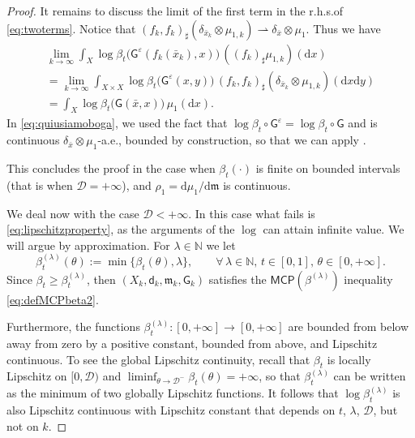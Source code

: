 \documentclass[11pt,a4paper]{article}
\theoremstyle{plain}
\theoremstyle{definition}
\theoremstyle{remark}
\numberwithin{equation}{section}
\newcommand{\N}{\mathbb{N}} %
\newcommand{\ve}{\varepsilon}
\newcommand{\MCP}{\mathsf{MCP}}
\newcommand{\cD}{\mathcal{D}}
\newcommand{\di}{\mathrm{d}}
\newcommand{\mm}{\mathfrak m}
\newcommand{\sfd}{\mathsf d}
\newcommand{\sfG}{\mathsf G}
\begin{document}
\begin{proof}
It remains to discuss the limit of the first term in the r.h.s.\@ of \eqref{eq:twoterms}. Notice that $(f_k,f_k)_\sharp (\delta_{\bar{x}_k}\otimes \mu_{1,k}) \rightharpoonup \delta_{\bar{x}}\otimes \mu_1$. Thus we have
\begin{multline}
\lim_{k\to \infty}   \int_{X} \log\beta_t\big(\sfG^{\ve}(f_k(\bar{x}_k),x)\big)\,((f_k)_\sharp\mu_{1,k})(\di x)  \\ 
 = \lim_{k\to \infty}  \int_{X\times X} \log\beta_t\big(\sfG^{\ve}(x,y)\big)\,(f_k,f_k)_\sharp \left(\delta_{\bar{x}_k}\otimes \mu_{1,k}\right)(\di x \di y) \\
 = \int_{X} \log\beta_t\big(\sfG(\bar{x},x)\big)\,\mu_1(\di x).\label{eq:quiusiamoboga}
\end{multline}
In \eqref{eq:quiusiamoboga}, we used the fact that $\log\beta_t\circ\sfG^\ve = \log\beta_t\circ \sfG$ and is continuous $\delta_{\bar{x}}\otimes\mu_1$-a.e., bounded by construction, so that we can apply \cite[Cor.\ 2.2.10]{Bogachev-Weak}.

This concludes the proof in the case when $\beta_t(\cdot)$ is finite on bounded intervals (that is when $\cD=+\infty$), and $\rho_1=\di \mu_1/\di \mm$ is continuous. 

We deal now with the case $\cD<+\infty$. In this case what fails is \eqref{eq:lipschitzproperty}, as the arguments of the $\log$ can attain infinite value. We will argue by approximation. For $\lambda \in \N$ we let
\begin{equation}
\beta_t^{(\lambda)}(\theta):=\min\{\beta_t(\theta),\lambda\}, \qquad \forall\,\lambda\in \N,\,t\in[0,1],\,\theta \in [0,+\infty].
\end{equation}
Since $\beta_t \geq \beta_t^{(\lambda)}$, then $(X_k,\sfd_k,\mm_k,\sfG_k)$ satisfies the $\MCP(\beta^{(\lambda)})$ inequality \eqref{eq:defMCPbeta2}.

Furthermore, the functions $\beta_t^{(\lambda)}:[0,+\infty]\to [0,+\infty]$ are bounded from below away from zero by a positive constant, bounded from above, and Lipschitz continuous. To see the global Lipschitz continuity, recall that $\beta_t$ is locally Lipschitz on $[0,\cD)$ and $\liminf_{\theta \to \cD^-}\beta_t(\theta) = +\infty$, so that $\beta_t^{(\lambda)}$ can be written as the minimum of two globally Lipschitz functions. It follows that $\log\beta^{(\lambda)}_t$ is also Lipschitz continuous with Lipschitz constant that depends on $t$, $\lambda$, $\cD$, but not on $k$. 


\end{proof}
\end{document}
